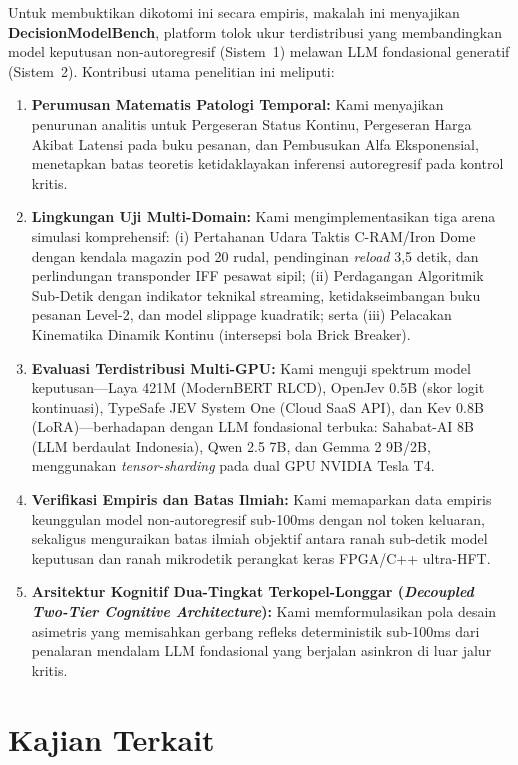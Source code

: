 \documentclass[journal,compsoc]{IEEEtran}
\begin{document}
Untuk membuktikan dikotomi ini secara empiris, makalah ini menyajikan \textbf{DecisionModelBench}, platform tolok ukur terdistribusi yang membandingkan model keputusan non-autoregresif (Sistem~1) melawan LLM fondasional generatif (Sistem~2). Kontribusi utama penelitian ini meliputi:
\begin{enumerate}
    \item \textbf{Perumusan Matematis Patologi Temporal:} Kami menyajikan penurunan analitis untuk Pergeseran Status Kontinu, Pergeseran Harga Akibat Latensi pada buku pesanan, dan Pembusukan Alfa Eksponensial, menetapkan batas teoretis ketidaklayakan inferensi autoregresif pada kontrol kritis.
    \item \textbf{Lingkungan Uji Multi-Domain:} Kami mengimplementasikan tiga arena simulasi komprehensif: (i) Pertahanan Udara Taktis C-RAM/Iron Dome dengan kendala magazin pod 20 rudal, pendinginan \textit{reload} 3,5 detik, dan perlindungan transponder IFF pesawat sipil; (ii) Perdagangan Algoritmik Sub-Detik dengan indikator teknikal streaming, ketidakseimbangan buku pesanan Level-2, dan model slippage kuadratik; serta (iii) Pelacakan Kinematika Dinamik Kontinu (intersepsi bola Brick Breaker).
    \item \textbf{Evaluasi Terdistribusi Multi-GPU:} Kami menguji spektrum model keputusan---Laya 421M (ModernBERT RLCD), OpenJev 0.5B (skor logit kontinuasi), TypeSafe JEV System One (Cloud SaaS API), dan Kev 0.8B (LoRA)---berhadapan dengan LLM fondasional terbuka: Sahabat-AI 8B (LLM berdaulat Indonesia), Qwen 2.5 7B, dan Gemma 2 9B/2B, menggunakan \textit{tensor-sharding} pada dual GPU NVIDIA Tesla T4.
    \item \textbf{Verifikasi Empiris dan Batas Ilmiah:} Kami memaparkan data empiris keunggulan model non-autoregresif sub-100ms dengan nol token keluaran, sekaligus menguraikan batas ilmiah objektif antara ranah sub-detik model keputusan dan ranah mikrodetik perangkat keras FPGA/C++ ultra-HFT.
    \item \textbf{Arsitektur Kognitif Dua-Tingkat Terkopel-Longgar (\textit{Decoupled Two-Tier Cognitive Architecture}):} Kami memformulasikan pola desain asimetris yang memisahkan gerbang refleks deterministik sub-100ms dari penalaran mendalam LLM fondasional yang berjalan asinkron di luar jalur kritis.
\end{enumerate}

\section{Kajian Terkait}
\end{document}
